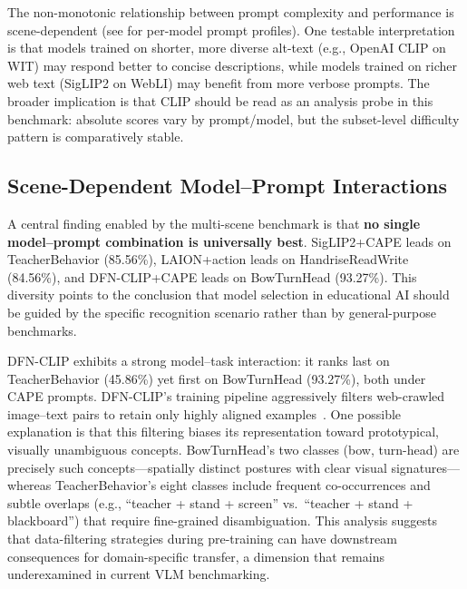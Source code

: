 \documentclass[electronics,article,submit,pdftex,moreauthors]{Definitions/mdpi}
\begin{document}
The non-monotonic relationship between prompt complexity and performance is scene-dependent (see  for per-model prompt profiles).
One testable interpretation is that models trained on shorter, more diverse alt-text (e.g., OpenAI CLIP on WIT) may respond better to concise descriptions, while models trained on richer web text (SigLIP2 on WebLI) may benefit from more verbose prompts.
The broader implication is that CLIP should be read as an analysis probe in this benchmark: absolute scores vary by prompt/model, but the subset-level difficulty pattern is comparatively stable.

\subsection{Scene-Dependent Model--Prompt Interactions}

A central finding enabled by the multi-scene benchmark is that \textbf{no single model--prompt combination is universally best}.
SigLIP2+CAPE leads on TeacherBehavior (85.56\%), LAION+action leads on HandriseReadWrite (84.56\%), and DFN-CLIP+CAPE leads on BowTurnHead (93.27\%).
This diversity points to the conclusion that model selection in educational AI should be guided by the specific recognition scenario rather than by general-purpose benchmarks.

DFN-CLIP exhibits a strong model--task interaction: it ranks last on TeacherBehavior (45.86\%) yet first on BowTurnHead (93.27\%), both under CAPE prompts.
DFN-CLIP's training pipeline aggressively filters web-crawled image--text pairs to retain only highly aligned examples~\cite{fang2023data}. One possible explanation is that this filtering biases its representation toward prototypical, visually unambiguous concepts.
BowTurnHead's two classes (bow, turn-head) are precisely such concepts---spatially distinct postures with clear visual signatures---whereas TeacherBehavior's eight classes include frequent co-occurrences and subtle overlaps (e.g., ``teacher + stand + screen'' vs.\ ``teacher + stand + blackboard'') that require fine-grained disambiguation.
This analysis suggests that data-filtering strategies during pre-training can have downstream consequences for domain-specific transfer, a dimension that remains underexamined in current VLM benchmarking.
\end{document}
